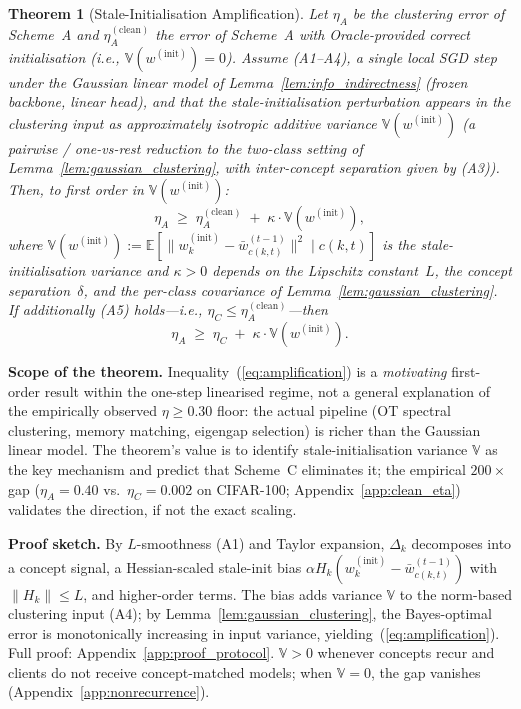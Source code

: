 \documentclass[11pt]{article}
\newcommand{\E}{\mathbb{E}}
\newcommand{\V}{\mathbb{V}}
\newcommand{\wbar}{\bar{w}}
\newtheorem{theorem}{Theorem}
\begin{document}
\begin{theorem}[Stale-Initialisation Amplification]
\label{thm:protocol}
Let $\eta_A$ be the clustering error of Scheme~A and $\eta_A^{(\mathrm{clean})}$ the error of Scheme~A with Oracle-provided correct initialisation (i.e., $\V(w^{(\mathrm{init})}) = 0$). Assume (A1--A4), a single local SGD step under the Gaussian linear model of Lemma~\ref{lem:info_indirectness} (frozen backbone, linear head), and that the stale-initialisation perturbation appears in the clustering input as approximately isotropic additive variance $\V(w^{(\mathrm{init})})$ (a pairwise / one-vs-rest reduction to the two-class setting of Lemma~\ref{lem:gaussian_clustering}, with inter-concept separation given by (A3)). Then, to first order in $\V(w^{(\mathrm{init})})$:
\begin{equation}
\eta_A \;\ge\; \eta_A^{(\mathrm{clean})} \;+\; \kappa \cdot \V(w^{(\mathrm{init})}),
\label{eq:amplification}
\end{equation}
where $\V(w^{(\mathrm{init})}) := \E[\|w_k^{(\mathrm{init})} - \wbar_{c(k,t)}^{(t-1)}\|^2 \mid c(k,t)]$ is the stale-initialisation variance and $\kappa > 0$ depends on the Lipschitz constant~$L$, the concept separation~$\delta$, and the per-class covariance of Lemma~\ref{lem:gaussian_clustering}.
If additionally (A5) holds---i.e., $\eta_C \le \eta_A^{(\mathrm{clean})}$---then
\begin{equation}
\eta_A \;\ge\; \eta_C \;+\; \kappa \cdot \V(w^{(\mathrm{init})}).
\label{eq:protocol}
\end{equation}
\end{theorem}

\textbf{Scope of the theorem.}
Inequality~(\ref{eq:amplification}) is a \emph{motivating} first-order result within the one-step linearised regime, not a general explanation of the empirically observed $\eta \ge 0.30$ floor: the actual pipeline (OT spectral clustering, memory matching, eigengap selection) is richer than the Gaussian linear model.
The theorem's value is to identify stale-initialisation variance $\V$ as the key mechanism and predict that Scheme~C eliminates it; the empirical $200\times$ gap ($\eta_A = 0.40$ vs.\ $\eta_C = 0.002$ on CIFAR-100; Appendix~\ref{app:clean_eta}) validates the direction, if not the exact scaling.

\textbf{Proof sketch.}
By $L$-smoothness (A1) and Taylor expansion, $\Delta_k$ decomposes into a concept signal, a Hessian-scaled stale-init bias $\alpha H_k (w_k^{(\mathrm{init})} - \wbar_{c(k,t)}^{(t-1)})$ with $\|H_k\| \le L$, and higher-order terms.
The bias adds variance $\V$ to the norm-based clustering input (A4); by Lemma~\ref{lem:gaussian_clustering}, the Bayes-optimal error is monotonically increasing in input variance, yielding~(\ref{eq:amplification}).
Full proof: Appendix~\ref{app:proof_protocol}.
$\V > 0$ whenever concepts recur and clients do not receive concept-matched models; when $\V = 0$, the gap vanishes (Appendix~\ref{app:nonrecurrence}).
\end{document}
